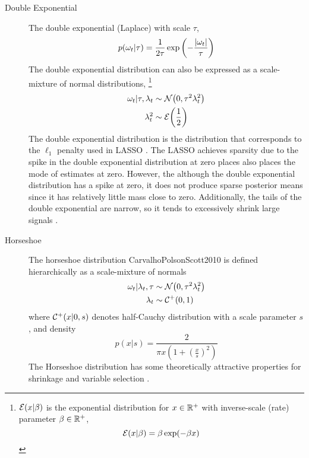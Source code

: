 \begin{description}
\item[Double Exponential] The double exponential (Laplace) with scale $\tau$,
\begin{equation}
  \label{dlm:eq:14}
  p(\omega_{t}| \tau) = \frac{1}{2 \tau} \exp 
  \left(
    - \frac{\lvert\omega_{t}\rvert}{\tau}
  \right)
\end{equation}
The double exponential distribution can also be expressed as a scale-mixture of normal distributions,%
\footnote{
  $\mathcal{E}\mathopen{}\left(x | \beta\right)\mathclose{}$ is the exponential distribution for $x \in \mathbb{R}^{+}$ with inverse-scale (rate) parameter $\beta \in \mathbb{R}^{+}$,
    \begin{equation}
      \label{dlm:eq:13}
      \mathcal{E}\mathopen{}\left(x | \beta\right)\mathclose{} = \beta \exp(- \beta x)
    \end{equation}
}
\begin{equation}
  \label{dlm:eq:12}
  \begin{aligned}[t]
  \omega_{t} | \tau, \lambda_{t} &\sim \mathcal{N}\mathopen{}\left(0, \tau^{2} \lambda_{t}^{2}\right)\mathclose{} \\
  \lambda_{t}^{2} & \sim \mathcal{E}\mathopen{}\left(\frac{1}{2}\right)\mathclose{}
  \end{aligned}
\end{equation}
The double exponential distribution is the distribution that corresponds to the $\ell_{1}$ penalty used in LASSO \parencites{ParkCasella2008}{Hans2009}.
The LASSO achieves sparsity due to the spike in the double exponential distribution at zero places also places the mode of estimates at zero. 
However, the although the double exponential distribution has a spike at zero, it does not produce sparse posterior means since it has relatively little mass close to zero.
Additionally, the tails of the double exponential are narrow, so it tends to excessively shrink large signals \parencites{CarvalhoPolsonScott2010}.

\item[Horseshoe] The horseshoe distribution \parencite{CarvalhoPolsonScott2009}{CarvalhoPolsonScott2010} is defined hierarchically as a scale-mixture of normals
\begin{equation}
  \label{dlm:eq:7}
  \begin{aligned}[t]
    \omega_{t} | \lambda_{t}, \tau & \sim \mathcal{N}\mathopen{}\left(0, \tau^{2} \lambda_{t}^{2}\right)\mathclose{} \\
    \lambda_{t}  & \sim \mathcal{C^+}\mathopen{}\left(0, 1\right)\mathclose{}
  \end{aligned}
\end{equation}
where $\mathcal{C^+}\mathopen{}\left(x | 0, s\right)\mathclose{}$ denotes half-Cauchy distribution with a scale parameter $s$, and density
\begin{equation}
  \label{dlm:eq:8}
  p(x | s) = \frac{2}{\pi x \left(1 + {\left(\frac{x}{s}\right)}^{2}\right)}
\end{equation}
The Horseshoe distribution has some theoretically attractive properties for shrinkage and variable selection \parencites{CarvalhoPolsonScott2009}{CarvalhoPolsonScott2010}{DattaGhosh2012}{PasKleijnVaart2014a}.


\end{description}
